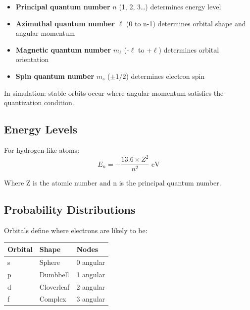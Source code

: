 \documentclass[
  11pt,
  letterpaper,
  twoside,
  openright]{book}
\providecommand{\tightlist}{%
  \setlength{\itemsep}{0pt}\setlength{\parskip}{0pt}}
\begin{document}
\begin{tcolorbox}[enhanced jigsaw, coltitle=black, colbacktitle=quarto-callout-note-color!10!white, toprule=.15mm, colframe=quarto-callout-note-color-frame, arc=.35mm, opacityback=0, bottomtitle=1mm, toptitle=1mm, breakable, colback=white, titlerule=0mm, opacitybacktitle=0.6, title=\textcolor{quarto-callout-note-color}{\faInfo}\hspace{0.5em}{Quantum Numbers}, rightrule=.15mm, bottomrule=.15mm, leftrule=.75mm, left=2mm]

\begin{itemize}
\tightlist
\item
  \textbf{Principal quantum number} \(n\) (1, 2, 3\ldots) determines
  energy level
\item
  \textbf{Azimuthal quantum number} \(\ell\) (0 to n-1) determines
  orbital shape and angular momentum
\item
  \textbf{Magnetic quantum number} \(m_\ell\) (-\(\ell\) to +\(\ell\))
  determines orbital orientation
\item
  \textbf{Spin quantum number} \(m_s\) (\(\pm 1/2\)) determines electron
  spin
\end{itemize}

\end{tcolorbox}

In simulation: stable orbits occur where angular momentum satisfies the
quantization condition.

\subsection{Energy Levels}\label{energy-levels}

For hydrogen-like atoms: \[
E_n = -\frac{13.6 \times Z^2}{n^2} \text{ eV}
\]

Where Z is the atomic number and n is the principal quantum number.

\subsection{Probability Distributions}\label{probability-distributions}

Orbitals define where electrons are likely to be:

\begin{longtable}[]{@{}lll@{}}
\toprule\noalign{}
Orbital & Shape & Nodes \\
\midrule\noalign{}
\endhead
\bottomrule\noalign{}
\endlastfoot
s & Sphere & 0 angular \\
p & Dumbbell & 1 angular \\
d & Cloverleaf & 2 angular \\
f & Complex & 3 angular \\
\end{longtable}
\end{document}
